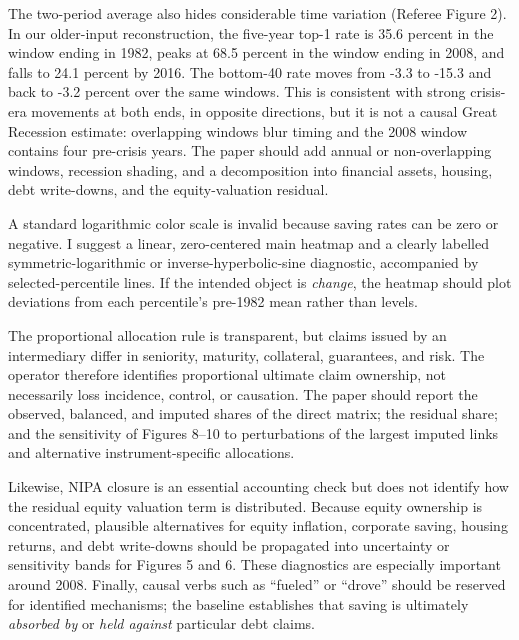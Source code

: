 The two-period average also hides considerable time variation (Referee Figure
2). In our older-input reconstruction, the five-year top-1 rate is 35.6 percent
in the window ending in 1982, peaks at 68.5 percent in the window ending in
2008, and falls to 24.1 percent by 2016. The bottom-40 rate moves from -3.3 to
-15.3 and back to -3.2 percent over the same windows. This is consistent with
strong crisis-era movements at both ends, in opposite directions, but it is
not a causal Great Recession estimate: overlapping windows blur timing and the
2008 window contains four pre-crisis years. The paper should add annual or
non-overlapping windows, recession shading, and a decomposition into financial
assets, housing, debt write-downs, and the equity-valuation residual.

A standard logarithmic color scale is invalid because saving rates can be zero
or negative. I suggest a linear, zero-centered main heatmap and a clearly
labelled symmetric-logarithmic or inverse-hyperbolic-sine diagnostic,
accompanied by selected-percentile lines. If the intended object is
\emph{change}, the heatmap should plot deviations from each percentile's
pre-1982 mean rather than levels.


The proportional allocation rule is transparent, but claims issued by an
intermediary differ in seniority, maturity, collateral, guarantees, and risk.
The operator therefore identifies proportional ultimate claim ownership, not
necessarily loss incidence, control, or causation. The paper should report the
observed, balanced, and imputed shares of the direct matrix; the residual
share; and the sensitivity of Figures 8--10 to perturbations of the largest
imputed links and alternative instrument-specific allocations.

Likewise, NIPA closure is an essential accounting check but does not identify
how the residual equity valuation term is distributed. Because equity
ownership is concentrated, plausible alternatives for equity inflation,
corporate saving, housing returns, and debt write-downs should be propagated
into uncertainty or sensitivity bands for Figures 5 and 6. These diagnostics
are especially important around 2008. Finally, causal verbs such as
``fueled'' or ``drove'' should be reserved for identified mechanisms; the
baseline establishes that saving is ultimately \emph{absorbed by} or
\emph{held against} particular debt claims.


